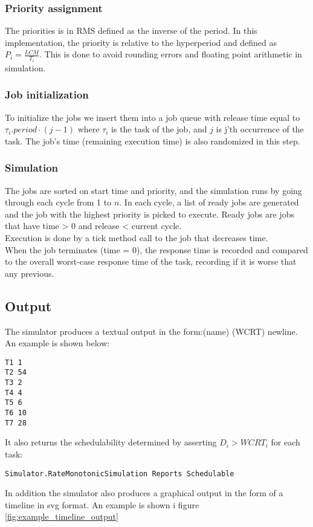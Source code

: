 \subsubsection*{Priority assignment}
The priorities is in RMS defined as the inverse of the period. In this implementation, the priority is relative to the hyperperiod and defined as $P_i = \frac{LCM}{T_i}$. This is done to avoid rounding errors and floating point arithmetic in simulation.
\subsubsection*{Job initialization}
To initialize the jobs we insert them into a job queue with release time equal to $\tau_{i}.period \cdot (j - 1)$ where $\tau_i$ is the task of the job, and $j$ is j'th occurrence of the task. The job's time  (remaining execution time) is also randomized in this step.
\subsubsection*{Simulation}
The jobs are sorted on start time and priority, and the simulation runs by going through each cycle from 1 to $n$. In each cycle, a list of ready jobs are generated and the job with the highest priority is picked to execute. Ready jobs are jobs that have time > 0 and release < current cycle.\\
Execution is done by a tick method call to the job that decreases time.\\
When the job terminates (time = 0), the response time is recorded and compared to the overall worst-case response time of the task, recording if it is worse that any previous.

\subsection{Output}
The simulator produces a textual output in the form:(name) (WCRT) newline. An example is shown below:
\begin{verbatim}
T1 1
T2 54
T3 2
T4 4
T5 6
T6 10
T7 28
\end{verbatim}
It also returns the schedulability determined by asserting $D_i > WCRT_i$ for each task:
\begin{verbatim}
Simulator.RateMonotonicSimulation Reports Schedulable
\end{verbatim}
In addition the simulator also produces a graphical output in the form of a timeline in svg format. An example is shown i figure \ref{fig:example_timeline_output}

